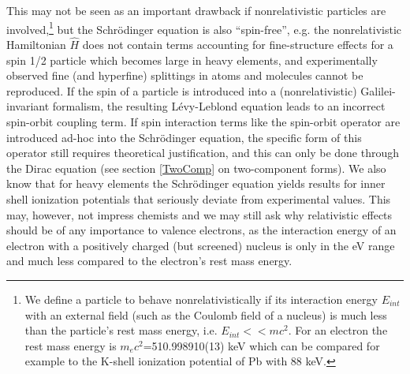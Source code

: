 \documentclass[12pt]{article}
\begin{document}
This may not be seen as an important drawback if nonrelativistic particles are involved,\footnote{We define a particle to behave nonrelativistically if its interaction energy $E_{int}$ with an external field (such as the Coulomb field of a nucleus) is much less than the particle's rest mass energy, i.e. $E_{int}<<mc^2$. For an electron the rest mass energy is $m_ec^2$=510.998910(13) keV which can be compared for example to the K-shell ionization potential of Pb with 88 keV.} but the Schr\"odinger equation is also ``spin-free'', e.g. the nonrelativistic Hamiltonian $\hat{H}$ does not contain terms accounting for fine-structure effects for a spin 1/2 particle which becomes large in heavy elements, and experimentally observed fine (and hyperfine) splittings in atoms and molecules cannot be reproduced. If the spin of a particle is introduced into a (nonrelativistic) Galilei-invariant formalism, the resulting L\'evy-Leblond equation leads to an incorrect spin-orbit coupling term.\cite{levy-leblond-1967} If spin interaction terms like the spin-orbit operator are introduced ad-hoc into the Schr{\"o}dinger equation, the specific form of this operator still requires theoretical justification, and this can only be done through the Dirac equation (see section \ref{TwoComp} on two-component forms). 
We also know that for heavy elements the Schr{\"o}dinger equation yields results for inner shell ionization potentials that seriously deviate from experimental values. This may, however, not impress chemists and we may still ask why relativistic effects should be of any importance to valence electrons, as the interaction energy of an electron with a positively charged (but screened) nucleus is only in the eV range and much less compared to the electron's rest mass energy.
\end{document}

